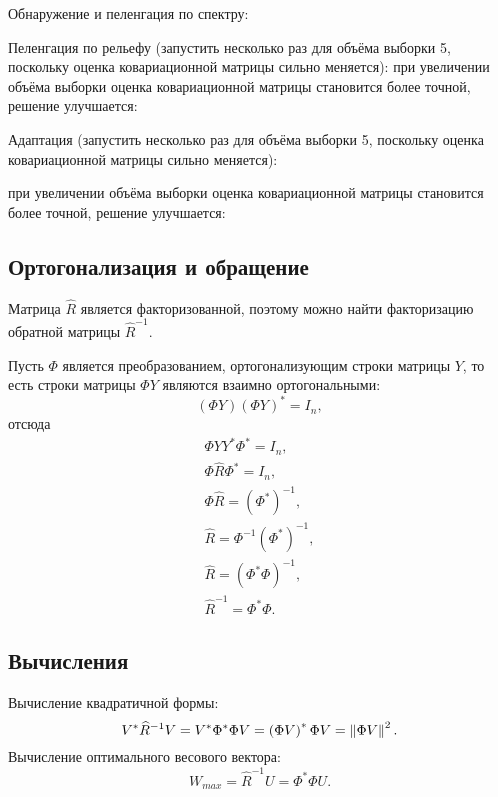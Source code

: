 Обнаружение и пеленгация по спектру:
\begin{Matlab}
\end{Matlab}

Пеленгация по рельефу (запустить несколько раз для объёма выборки 5, поскольку оценка ковариационной матрицы сильно меняется):
\noindent при увеличении объёма выборки оценка ковариационной матрицы становится более точной, решение улучшается:

Адаптация (запустить несколько раз для объёма выборки 5, поскольку оценка ковариационной матрицы сильно меняется):
\begin{Matlab}
\end{Matlab}
\noindent при увеличении объёма выборки оценка ковариационной матрицы становится более точной, решение улучшается:

\subsection{Ортогонализация и обращение}

Матрица $\widehat{R}$ является факторизованной, поэтому можно найти факторизацию обратной матрицы $\widehat{R}^{-1}$.

Пусть $\Phi$ является преобразованием, ортогонализующим строки матрицы $Y$, то есть строки матрицы $\Phi Y$ являются взаимно ортогональными:
\[
    \left ( \Phi Y \right ) \left ( \Phi Y \right )^* = I_n ,
\]
отсюда
\begin{gather*}
    \Phi Y Y^* \Phi^* = I_n , \\
    \Phi \widehat{R} \Phi^* = I_n , \\
    \Phi \widehat{R} = \left(\Phi^* \right)^{-1}, \\
    \widehat{R} = \Phi^{-1} \left(\Phi^* \right)^{-1}, \\
    \widehat{R} = \left(\Phi^* \Phi \right)^{-1}, \\
    \widehat{R}^{-1} = \Phi^* \Phi .
\end{gather*}

\subsection{Вычисления}

Вычисление квадратичной формы:
\[
    V^* \widehat{R}^{-1} V
    = V^* \Phi^* \Phi V
    = \left ( \Phi V \right )^* \Phi V
    = \left \| \Phi V \right \|^2 .
\]
Вычисление оптимального весового вектора:
\[
    W_{max}
    = \widehat{R}^{-1} U
    = \Phi^* \Phi U .
\]